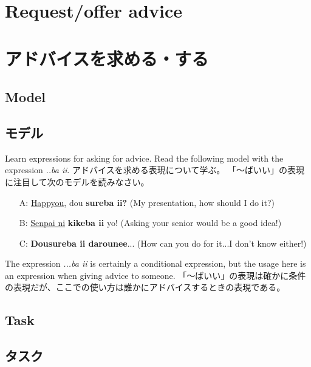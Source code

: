 \documentclass[uplatex,dvipdfmx,b5paper,english,10pt]{jsbook}
\begin{document}
\ifEnglish
  \section{Request/offer advice}
\else
  \section{アドバイスを求める・する}
\fi

\ifEnglish
\subsection{Model}
\else
\subsection{モデル}
\fi

\begin{toiquestion}
\ifEnglish
Learn expressions for asking for advice.
Read the following model with the expression {\it ..ba ii\/}.
\else
アドバイスを求める表現について学ぶ。
「～ばいい」の表現に注目して次のモデルを読みなさい。
\fi
\end{toiquestion}

\begin{itemize}
 \item[A:] \underline{Happyou}, dou {\bfseries sureba ii?} (My presentation, how should I do it?)
 \item[B:] \underline{Senpai ni} {\bfseries kikeba ii} yo! (Asking your senior would be a good idea!)
 \item[C:] {\bfseries Dousureba ii darounee}... (How can you do for it...I don't know either!)
\end{itemize}

\begin{toianswer}
\ifEnglish
The expression {\it ...ba ii\/} is certainly a conditional expression, but the usage here is an expression when giving advice to someone.
\else
「～ばいい」の表現は確かに条件の表現だが、ここでの使い方は誰かにアドバイスするときの表現である。
\fi
\end{toianswer}


\ifEnglish
\subsection{Task}
\else
\subsection{タスク}
\fi
\end{document}
